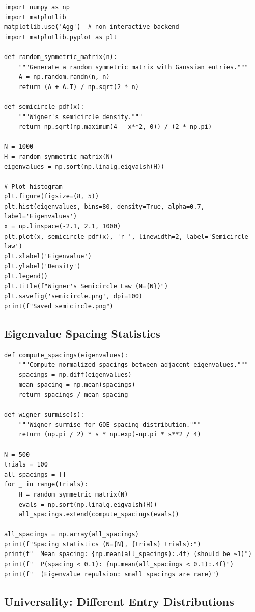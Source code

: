 \begin{verbatim}
import numpy as np
import matplotlib
matplotlib.use('Agg')  # non-interactive backend
import matplotlib.pyplot as plt

def random_symmetric_matrix(n):
    """Generate a random symmetric matrix with Gaussian entries."""
    A = np.random.randn(n, n)
    return (A + A.T) / np.sqrt(2 * n)

def semicircle_pdf(x):
    """Wigner's semicircle density."""
    return np.sqrt(np.maximum(4 - x**2, 0)) / (2 * np.pi)

N = 1000
H = random_symmetric_matrix(N)
eigenvalues = np.sort(np.linalg.eigvalsh(H))

# Plot histogram
plt.figure(figsize=(8, 5))
plt.hist(eigenvalues, bins=80, density=True, alpha=0.7, label='Eigenvalues')
x = np.linspace(-2.1, 2.1, 1000)
plt.plot(x, semicircle_pdf(x), 'r-', linewidth=2, label='Semicircle law')
plt.xlabel('Eigenvalue')
plt.ylabel('Density')
plt.legend()
plt.title(f"Wigner's Semicircle Law (N={N})")
plt.savefig('semicircle.png', dpi=100)
print(f"Saved semicircle.png")
\end{verbatim}

\subsection{Eigenvalue Spacing Statistics}

\begin{verbatim}
def compute_spacings(eigenvalues):
    """Compute normalized spacings between adjacent eigenvalues."""
    spacings = np.diff(eigenvalues)
    mean_spacing = np.mean(spacings)
    return spacings / mean_spacing

def wigner_surmise(s):
    """Wigner surmise for GOE spacing distribution."""
    return (np.pi / 2) * s * np.exp(-np.pi * s**2 / 4)

N = 500
trials = 100
all_spacings = []
for _ in range(trials):
    H = random_symmetric_matrix(N)
    evals = np.sort(np.linalg.eigvalsh(H))
    all_spacings.extend(compute_spacings(evals))

all_spacings = np.array(all_spacings)
print(f"Spacing statistics (N={N}, {trials} trials):")
print(f"  Mean spacing: {np.mean(all_spacings):.4f} (should be ~1)")
print(f"  P(spacing < 0.1): {np.mean(all_spacings < 0.1):.4f}")
print(f"  (Eigenvalue repulsion: small spacings are rare)")
\end{verbatim}

\subsection{Universality: Different Entry Distributions}

